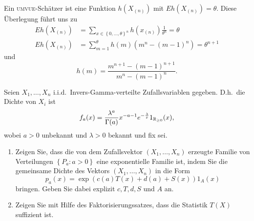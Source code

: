 Ein \textsc{umvue}-Schätzer ist eine Funktion $h(X_{(n)})$ mit $E h(X_{(n)})=\theta$.
Diese Überlegung führt uns zu
\begin{align*}
    E h(X_{(n)}) &= 
    \sum_{x\in \left\{ 0,\ldots,\theta \right\}^n } h(x_{(n)}) \frac{1}{\theta^n} = \theta \\
    E h(X_{(n)}) &= \sum_{m=1}^{\theta} h(m)(m^n - (m-1)^n) = \theta^{n+1}
\end{align*}
und
\begin{equation*}
    h(m) = \frac{m^{n+1} - (m-1)^{n+1}}{m^n - (m-1)^{n}}.
\end{equation*}



Seien $X_1,\ldots,X_n$ i.i.d.\ Invers-Gamma-verteilte Zufallsvariablen gegeben.
D.h.\ die Dichte von $X_i$ ist 
\begin{equation*}
    f_{a}(x) = \frac{\lambda^a}{\Gamma(a)}x^{-a-1} e^{-\frac{\lambda}{x}}1_{\mathbb R_{\geq 0}}(x),
\end{equation*}
wobei $a>0$ unbekannt und $\lambda>0$ bekannt und fix sei.
\begin{enumerate}
    \item Zeigen Sie, dass die von dem Zufallsvektor $( X_1,\ldots,X_n)$
        erzeugte Familie von Verteilungen $\left\{ P_a : a>0 \right\}$ eine
        exponentielle Familie ist, indem Sie die gemeinsame Dichte des Vektors
        $(X_1,\ldots,X_n)$ in die Form
        \begin{equation*}
            p_a(x) = \exp\left( c(a) T(x) + d(a) + S(x) \right)1_A (x)
        \end{equation*}
        bringen. Geben Sie dabei explizit $c,T,d,S$ und $A$ an.
    \item Zeigen Sie mit Hilfe des Faktorisierungssatzes, dass die Statistik
        $T(X)$ suffizient ist.
\end{enumerate}

